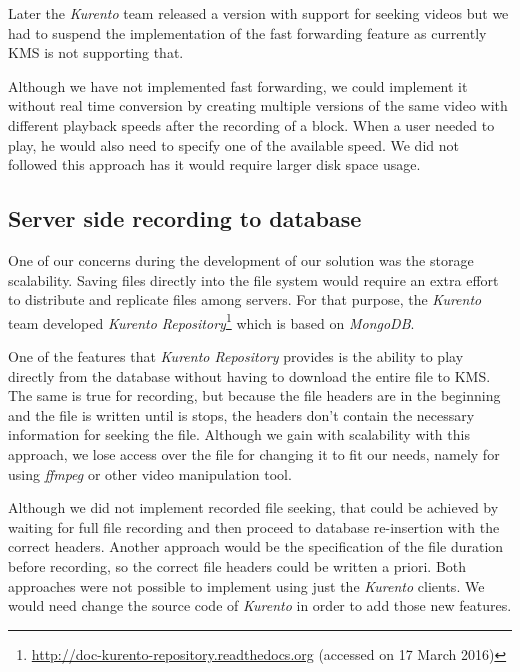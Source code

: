 	Later the \emph{Kurento} team released a version with support for seeking videos but we had to suspend the implementation of the fast forwarding feature as currently \ac{KMS} is not supporting that.

	Although we have not implemented fast forwarding, we could implement it without real time conversion by creating multiple versions of the same video with different playback speeds after the recording of a block. When a user needed to play, he would also need to specify one of the available speed. We did not followed this approach has it would require larger disk space usage. 

\subsection{Server side recording to database}

	One of our concerns during the development of our solution was the storage scalability. Saving files directly into the file system would require an extra effort to distribute and replicate files among servers. For that purpose, the \emph{Kurento} team developed \emph{Kurento Repository}\footnote{\url{http://doc-kurento-repository.readthedocs.org} (accessed on 17 March 2016)} which is based on \emph{MongoDB}.

	One of the features that \emph{Kurento Repository} provides is the ability to play directly from the database without having to download the entire file to \ac{KMS}. The same is true for recording, but because the file headers are in the beginning and the file is written until is stops, the headers don't contain the necessary information for seeking the file.
	Although we gain with scalability with this approach, we lose access over the file for changing it to fit our needs, namely for using \emph{ffmpeg} or other video manipulation tool.
        
	Although we did not implement recorded file seeking, that could be achieved by waiting for full file recording and then proceed to database re-insertion with the correct headers. Another approach would be the specification of the file duration before recording, so the correct file headers could be written a priori. Both approaches were not possible to implement using just the \emph{Kurento} clients. We would need change the source code of \emph{Kurento} in order to add those new features.
        
    




